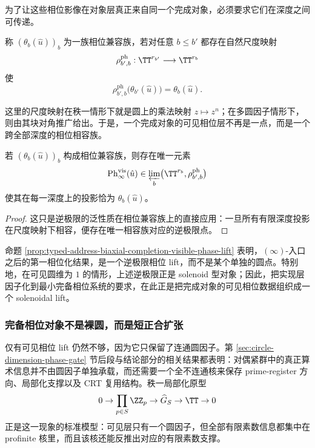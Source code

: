为了让这些相位影像在对象层真正来自同一个完成对象，必须要求它们在深度之间可传递。

\begin{definition}[相位兼容族]\label{def:typed-address-biaxial-completion-phase-compatible-family}
称 \((\theta_b(\hat u))_b\) 为一族相位兼容族，若对任意 \(b\le b'\) 都存在自然尺度映射
\[
\rho^{\mathrm{ph}}_{b',b}:\TT^{r_{b'}}\longrightarrow \TT^{r_b}
\]
使
\[
\rho^{\mathrm{ph}}_{b',b}\bigl(\theta_{b'}(\hat u)\bigr)=\theta_b(\hat u).
\]
\end{definition}

这里的尺度映射在秩一情形下就是圆上的乘法映射 \(z\mapsto z^n\)；在多圆因子情形下，则由其块对角推广给出。于是，一个完成对象的可见相位层不再是一点，而是一个跨全部深度的相位相容族。

\begin{proposition}\label{prop:typed-address-biaxial-completion-visible-phase-lift}
若 \((\theta_b(\hat u))_b\) 构成相位兼容族，则存在唯一元素
\[
\operatorname{Ph}^{\mathrm{vis}}_{\infty}(\hat u)\in
\varprojlim_b\bigl(\TT^{r_b},\rho^{\mathrm{ph}}_{b',b}\bigr)
\]
使其在每一深度上的投影恰为 \(\theta_b(\hat u)\)。
\end{proposition}
\begin{proof}
这只是逆极限的泛性质在相位兼容族上的直接应用：一旦所有有限深度投影在尺度映射下相容，便存在唯一相容族对应的逆极限点。
\end{proof}

命题 \ref{prop:typed-address-biaxial-completion-visible-phase-lift} 表明，\((\infty)\)-入口之后的第一相位化结果，是一个逆极限相位 lift，而不是某个单独的圆点。特别地，在可见圆维为 \(1\) 的情形，上述逆极限正是 solenoid 型对象；因此，把实现层因子化到最小完备相位系统的要求，在此正是把完成对象的可见相位数据组织成一个 solenoidal lift。

\subsubsection{完备相位对象不是裸圆，而是短正合扩张}\label{subsubsec:typed-address-biaxial-completion-complete-phase-extension}
仅有可见相位 lift 仍然不够，因为它只保留了连通圆因子。第 \ref{sec:circle-dimension-phase-gate} 节后段与结论部分的相关结果都表明：对偶紧群中的真正算术信息并不由圆因子单独承载，而还需要一个全不连通核来保存 prime-register 方向、局部化支撑以及 CRT 复用结构。秩一局部化原型
\[
0\to \prod_{p\in S}\ZZ_p\to \widehat G_S\to \TT\to 0
\]
正是这一现象的标准模型：可见层只有一个圆因子，但全部有限素数信息都集中在 profinite 核里，而且该核还能反推出对应的有限素数支撑。

